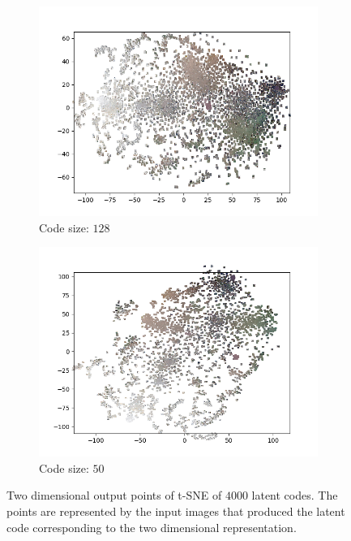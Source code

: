 \begin{figure}[H]
\begin{subfigure}{.5\textwidth}
        \centering
        \includegraphics[width=\textwidth]{images/figures/experiments_latent/convolutional_dim128_images.png}   
        \caption{Code size: $128$}
    \end{subfigure}%
    \begin{subfigure}{.5\textwidth}
        \centering
        \includegraphics[width=\textwidth]{images/figures/experiments_latent/convolutional_dim50_images.png}
        \caption{Code size: $50$}
    \end{subfigure}
    \caption{Two dimensional output points of t-SNE of $4000$ latent codes. The points are represented by the input
    images that produced the latent code corresponding 
    to the two dimensional representation.} \label{figure_images_convolutional_tsne}
\end{figure} 

